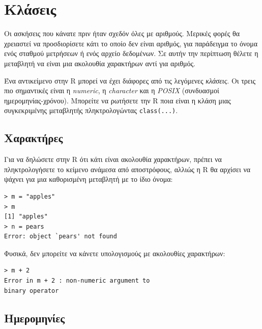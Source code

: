 \documentclass[a4paper,10pt,twocolumn]{article}
\begin{document}
\section{Κλάσεις}

Οι ασκήσεις που κάνατε πριν ήταν σχεδόν όλες με αριθμούς. Μερικές φορές θα χρειαστεί να προσδιορίσετε κάτι το 
οποίο δεν είναι αριθμός, για παράδειγμα το όνομα ενός σταθμού μετρήσεων ή ενός αρχείο δεδομένων. Σε αυτήν την
περίπτωση θέλετε η μεταβλητή να είναι μια ακολουθία χαρακτήρων αντί για αριθμός. 

Ένα αντικείμενο στην R μπορεί να έχει διάφορες από τις λεγόμενες \emph{κλάσεις}. Οι τρεις πιο σημαντικές είναι
η \emph{numeric}, η \emph{character} και η \emph{POSIX} (συνδυασμοί ημερομηνίας-χρόνου). Μπορείτε να ρωτήσετε
την R ποια είναι η κλάση μιας συγκεκριμένης μεταβλητής πληκτρολογώντας \texttt{class(...)}. 

\subsection{Χαρακτήρες}
\label{sec:characters}

Για να δηλώσετε στην R ότι κάτι είναι ακολουθία χαρακτήρων, πρέπει να πληκτρολογήσετε το κείμενο ανάμεσα από
αποστρόφους, αλλιώς η R θα αρχίσει να ψάχνει για μια καθορισμένη μεταβλητή με το ίδιο όνομα:

\begin{Verbatim}[frame=single,gobble=0]
> m = "apples"
> m
[1] "apples"
> n = pears
Error: object `pears' not found
\end{Verbatim}

Φυσικά, δεν μπορείτε να κάνετε υπολογισμούς με ακολουθίες χαρακτήρων:

\begin{Verbatim}[frame=single,gobble=0]
> m + 2
Error in m + 2 : non-numeric argument to 
binary operator
\end{Verbatim}

\subsection{Ημερομηνίες}
\end{document}
